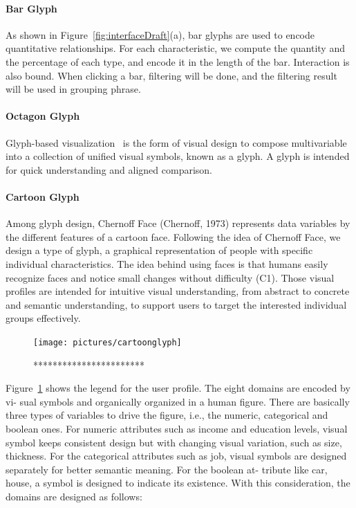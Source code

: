 \paragraph{Bar Glyph}
As shown in Figure~{\ref{fig:interfaceDraft}}(a), bar glyphs are used to encode quantitative relationships. For each characteristic, we compute the quantity and the percentage of each type, and encode it in the length of the bar. Interaction is also bound. When clicking a bar, filtering will be done, and the filtering result will be used in grouping phrase.

\paragraph{Octagon Glyph}
Glyph-based visualization~\cite{borgo2013glyph} is the form of visual design to compose multivariable into a collection of unified visual symbols, known as a glyph. A glyph is intended for quick understanding and aligned comparison. 


\paragraph{Cartoon Glyph}
Among glyph design, Chernoff Face (Chernoff, 1973) represents data variables by the different features of a cartoon face. Following the idea of Chernoff Face, we design a type of glyph, a graphical representation of people with specific individual characteristics. The idea behind using faces is that humans easily recognize faces and notice small changes without difficulty (C1). Those visual profiles are intended for intuitive visual understanding, from abstract to concrete and semantic understanding, to support users to target the interested individual groups effectively.

\begin{figure}[htb!]
 \centering 
 \texttt{[image: pictures/cartoonglyph]}
 \caption{***********************}
 \label{fig:cartoon}
\end{figure}

Figure~\ref{fig:cartoon} shows the legend for the user profile. The eight domains are encoded by vi- sual symbols and organically organized in a human figure. There are basically three types of variables to drive the figure, i.e., the numeric, categorical and boolean ones. For numeric attributes such as income and education levels, visual symbol keeps consistent design but with changing visual variation, such as size, thickness. For the categorical attributes such as job, visual symbols are designed separately for better semantic meaning. For the boolean at- tribute like car, house, a symbol is designed to indicate its existence. With this consideration, the domains are designed as follows:

